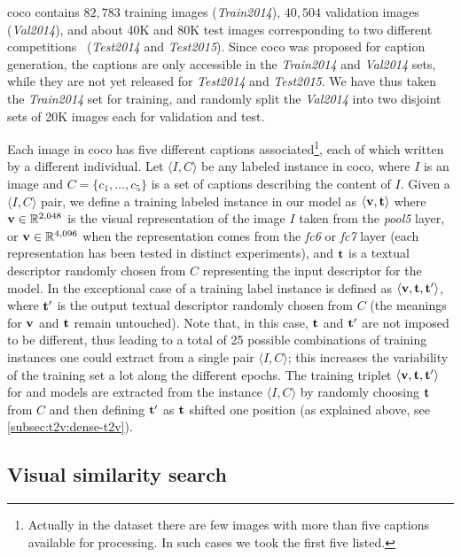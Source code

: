 \gls{coco} contains $82,783$ training images (\emph{Train2014}), $40,504$ validation images (\emph{Val2014}), and about 40K and 80K test images corresponding to two different competitions~\cite{chen2015microsoft} (\emph{Test2014} and \emph{Test2015}).
Since \gls{coco} was proposed for caption generation, the captions are only accessible in the \emph{Train2014} and \emph{Val2014} sets, while they are not yet released for \emph{Test2014} and \emph{Test2015}. %
We have thus taken the \emph{Train2014} set for training, and randomly split the \emph{Val2014} into two disjoint sets of 20K images each for validation and test.

Each image in \gls{coco} has five different captions associated\footnote{Actually in the dataset there are few images with more than five captions available for processing. In such cases we took the first five listed.}, each of which written by a different individual.
Let $\langle I, C \rangle$ be any labeled instance in \gls{coco}, where $I$ is an image and $C = \{ c_1, \ldots, c_5\}$ is a set of captions describing the content of $I$.
Given a $\langle I, C \rangle$ pair, we define a training labeled instance in our model as $\left \langle \mathbf{v},\mathbf{t} \right \rangle$ where $\mathbf{v} \in \mathbb{R}^{2,048}$ is the visual representation of the image $I$ taken from the \emph{pool5} layer, or $\mathbf{v} \in \mathbb{R}^{4,096}$ when the representation comes from the \emph{fc6} or \emph{fc7} layer (each representation has been tested in distinct experiments), and $\mathbf{t}$ is a textual descriptor randomly chosen from $C$ representing the input descriptor for the model.
In the exceptional case of \sparsettv{} a training label instance is defined as $\left \langle \mathbf{v}, \mathbf{t}, \mathbf{t}' \right\rangle$, where $\mathbf{t}'$ is the output textual descriptor randomly chosen from $C$ (the meanings for $\mathbf{v}$ and $\mathbf{t}$ remain untouched).
Note that, in this case, $\mathbf{t}$ and $\mathbf{t}'$ are not imposed to be different, thus leading to a total of 25 possible combinations of training instances one could extract from a single pair $\langle I, C \rangle$;
this increases the variability of the training set a lot along the different epochs.
The training triplet $\langle \mathbf{v}, \mathbf{t}, \mathbf{t}' \rangle$ for \densettv{} and \widedeepttv{} models are extracted from the instance $\langle I, C \rangle$ by randomly choosing $\mathbf{t}$ from $C$ and then defining $\mathbf{t}'$ as $\mathbf{t}$ shifted one position (as explained above, see \ref{subsec:t2v:dense-t2v}).


\subsection{Visual similarity search}

